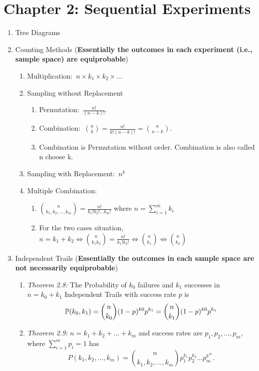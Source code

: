 \section*{Chapter 2: Sequential Experiments}
\begin{enumerate}
    \item Tree Diagrams
    \item Counting Methods (\textbf{Essentially the outcomes in each experiment (i.e., sample space) are equiprobable})
    \begin{enumerate}
        \item Multiplication:~$n\times k_1\times k_2\times \ldots$
        \item Sampling without Replacement
        \begin{enumerate}
            \item Permutation:~$\frac{n!}{(n-k)!}$.
            \item Combination:~$\binom{n}{k}=\frac{n!}{k!(n-k)!}=\binom{n}{n-k}$.
            \item Combination is Permutation without order. Combination is also called n choose k.
        \end{enumerate}
        \item Sampling with Replacement:~$n^k$
        \item Multiple Combination:{
            \begin{enumerate}
                \item $\binom{n}{k_1,k_2,\ldots,k_m}=\frac{n!}{k_1!k_2!\ldots k_m!}$ where $n=\sum_{i=1}^{m}k_i$
                \item For the two cases situation, $n=k_1+k_2\iff \binom{n}{k_1k_2}=\frac{n!}{k_1!k_2!}\iff\binom{n}{k_1}\iff\binom{n}{k_2}$
            \end{enumerate}
            }
    \end{enumerate}
    \item Independent Trails (\textbf{Essentially the outcomes in each sample space are not necessarily equiprobable})
    \begin{enumerate}
        \item \textit{Theorem 2.8:} The Probability of $k_0$ failures and $k_1$ successes in $n=k_0+k_1$ Independent Trails with success rate $p$ is \[\P{k_0, k_1}=\binom{n}{k_0}(1-p)^{k0}p^{k_1}=\binom{n}{k_1}(1-p)^{k0}p^{k_1}\]
        \item \textit{Theorem 2.9:} $n=k_1+k_2+\ldots+k_m$ and success rates are $p_1, p_2,\ldots,p_m$, where $\sum_{i=1}^{m}p_i=1$ has 
        $$P(k_1,k_2,\ldots,k_m)=\binom{n}{k_1,k_2,\ldots,k_m}p_1^{k_1}p_2^{k_2}\ldots p_m^{k^m}.$$
    \end{enumerate}
\end{enumerate}